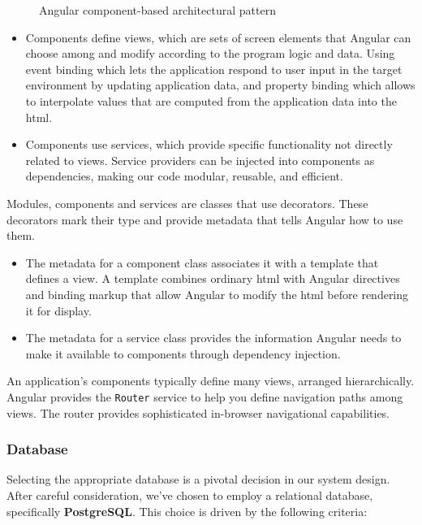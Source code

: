 \begin{figure}[hbt!]
      \centering
      
      \caption{Angular component-based architectural pattern}
      \label{angular-arch}
\end{figure}

\begin{itemize}
      \item Components define views, which are sets of screen elements that Angular can choose among
            and modify according to the program logic and data. Using event binding which lets the
            application respond to user input in the target environment by updating application data, and
            property binding which allows to interpolate values that are computed from the application
            data into the \acrshort{html}.
      \item Components use services, which provide specific functionality not directly related to views.
            Service providers can be injected into components as dependencies, making our code modular,
            reusable, and efficient.
\end{itemize}



\noindent Modules, components and services are classes that use decorators. These decorators mark their type
and provide metadata that tells Angular how to use them.

\begin{itemize}
      \item The metadata for a component class associates it with a template that defines a view.
            A template combines ordinary \acrshort*{html} with Angular directives and binding markup that allow
            Angular to modify the \acrshort*{html} before rendering it for display.
      \item The metadata for a service class provides the information Angular needs to make it available
            to components through dependency injection.
\end{itemize}

An application's components typically define many views, arranged hierarchically. Angular provides the
\texttt{Router} service to help you define navigation paths among views. The router provides sophisticated
in-browser navigational capabilities.

\subsubsection{Database}
Selecting the appropriate database is a pivotal decision in our system design. After careful consideration,
we've chosen to employ a relational database, specifically \textbf{PostgreSQL}. This choice is driven by the
following criteria:

